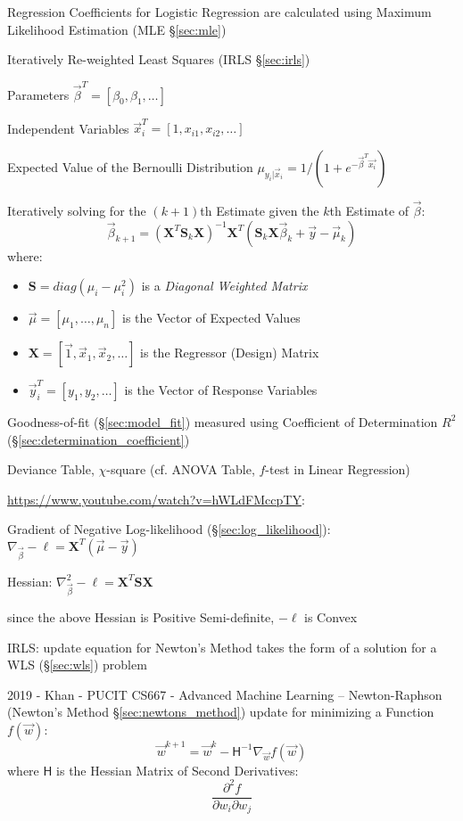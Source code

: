 Regression Coefficients for Logistic Regression are calculated using Maximum
Likelihood Estimation (MLE \S\ref{sec:mle})

Iteratively Re-weighted Least Squares (IRLS \S\ref{sec:irls})

Parameters $\vec{\beta}^T = [\beta_0, \beta_1, \ldots]$

Independent Variables $\vec{x}_i^T = [1, x_{i1}, x_{i2}, \ldots]$

Expected Value of the Bernoulli Distribution
$\mu_{y_i | \vec{x}_i} = 1 / (1 + e^{-\vec{\beta}^T \vec{x_i}})$

Iteratively solving for the $(k+1)$th Estimate given the $k$th Estimate of
$\vec{\beta}$:
\[
  \vec{\beta}_{k+1} = (\mathbf{X}^T \mathbf{S}_k \mathbf{X})^{-1} \mathbf{X}^T
    (\mathbf{S}_k \mathbf{X} \vec{\beta}_k + \vec{y} - \vec{\mu}_k)
\]
where:
\begin{itemize}
  \item $\mathbf{S} = diag(\mu_i - \mu_i^2)$ is a
    \emph{Diagonal Weighted Matrix}
  \item $\vec{\mu} = [\mu_1, \ldots, \mu_n]$ is the Vector of Expected Values
  \item $\mathbf{X} = [\vec{1}, \vec{x}_1, \vec{x}_2, \ldots]$ is the Regressor
    (Design) Matrix
  \item $\vec{y}_i^T = [y_1, y_2, \ldots]$ is the Vector of Response Variables
\end{itemize}

Goodness-of-fit (\S\ref{sec:model_fit}) measured using Coefficient of
Determination $R^2$ (\S\ref{sec:determination_coefficient})

Deviance Table, $\chi$-square (cf. ANOVA Table, $f$-test in Linear Regression)

\url{https://www.youtube.com/watch?v=hWLdFMccpTY}:

Gradient of Negative Log-likelihood (\S\ref{sec:log_likelihood}):
$\nabla_{\vec{\beta}} -\ell = \mathbf{X}^T (\vec{\mu} - \vec{y})$

Hessian:
$\nabla_{\vec{\beta}}^2 -\ell = \mathbf{X}^T \mathbf{S} \mathbf{X}$

since the above Hessian is Positive Semi-definite, $-\ell$ is Convex

IRLS: update equation for Newton's Method takes the form of a solution for a WLS
(\S\ref{sec:wls}) problem

\asterism

2019 - Khan - PUCIT CS667 - Advanced Machine Learning --
Newton-Raphson (Newton's Method \S\ref{sec:newtons_method}) update for
minimizing a Function $f(\vec{w})$:
\[
  \vec{w}^{k+1} = \vec{w}^k - \mathsf{H}^{-1}\nabla_{\vec{w}} f(\vec{w})
\]
where $\mathsf{H}$ is the Hessian Matrix of Second Derivatives:
\[
  \frac{\partial^2 f}{\partial{w_i} \partial{w_j}}
\]

